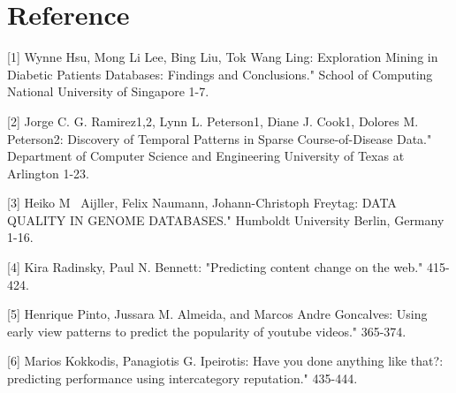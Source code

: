 \documentclass[sts]{sig-alternate}
\begin{document}
\section{Reference}
	\label{Reference}

	[1] Wynne Hsu, Mong Li Lee, Bing Liu, Tok Wang Ling: Exploration Mining in Diabetic Patients 				Databases: Findings and Conclusions." School of Computing National University of Singapore 1-7.			\newline
	
	[2] Jorge C. G. Ramirez1,2, Lynn L. Peterson1, Diane J. Cook1, Dolores M. Peterson2: Discovery of 		Temporal Patterns in Sparse Course-of-Disease Data." Department of Computer Science and Engineering 		University of Texas at Arlington 1-23.\newline

	[3] Heiko M~ Aijller, Felix Naumann, Johann-Christoph Freytag: DATA QUALITY IN GENOME DATABASES." 		Humboldt University Berlin, Germany 1-16.\newline

	[4] Kira Radinsky, Paul N. Bennett: "Predicting content change on the web." 415-424.\newline
	
	[5] Henrique Pinto, Jussara M. Almeida, and Marcos Andre Goncalves: Using early view patterns to 			predict the popularity of youtube videos." 365-374.\newline	

	[6] Marios Kokkodis, Panagiotis G. Ipeirotis: Have you done anything like that?: predicting 				performance using intercategory reputation." 435-444.\newline
	
	
	
\end{document}
